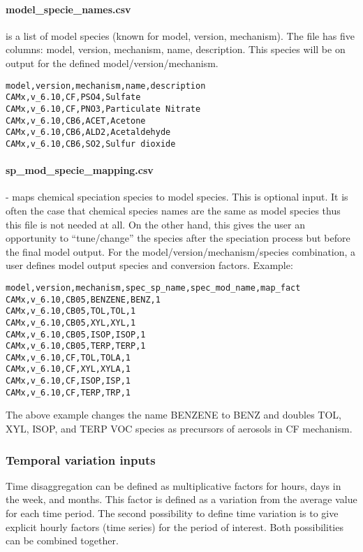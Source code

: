 \documentclass[a4paper,11pt]{article}
\begin{document}
\paragraph{model\_specie\_names.csv} is a 
list of model species (known for model, version, mechanism). The file
has five columns: model, version, mechanism, name, description. This
species will be on output for the defined model/version/mechanism.
\begin{verbatim}
model,version,mechanism,name,description
CAMx,v_6.10,CF,PSO4,Sulfate
CAMx,v_6.10,CF,PNO3,Particulate Nitrate
CAMx,v_6.10,CB6,ACET,Acetone
CAMx,v_6.10,CB6,ALD2,Acetaldehyde
CAMx,v_6.10,CB6,SO2,Sulfur dioxide
\end{verbatim}

\paragraph{sp\_mod\_specie\_mapping.csv} - maps chemical speciation species to model
  species. This is optional input. It is often the case that chemical species names are the same as model species thus this file is not needed at all. On the other hand, this gives the user an opportunity to ``tune/change'' the species after the speciation process but before the final model output. For the model/version/mechanism/species combination, a user defines model output species and conversion factors. Example:
\begin{verbatim} 
model,version,mechanism,spec_sp_name,spec_mod_name,map_fact
CAMx,v_6.10,CB05,BENZENE,BENZ,1
CAMx,v_6.10,CB05,TOL,TOL,1
CAMx,v_6.10,CB05,XYL,XYL,1
CAMx,v_6.10,CB05,ISOP,ISOP,1
CAMx,v_6.10,CB05,TERP,TERP,1
CAMx,v_6.10,CF,TOL,TOLA,1
CAMx,v_6.10,CF,XYL,XYLA,1
CAMx,v_6.10,CF,ISOP,ISP,1
CAMx,v_6.10,CF,TERP,TRP,1
\end{verbatim}
The above example changes the name BENZENE to BENZ and doubles TOL, XYL, ISOP, and TERP VOC species as precursors of aerosols in CF mechanism. 

\subsubsection{Temporal variation inputs}\label{temporal-variation-inputs}

Time disaggregation can be defined as multiplicative factors for hours, days in the week,
and months. This factor is defined as a variation from the average value for each
time period. The second possibility to define time variation is to give
explicit hourly factors (time series) for the period of interest. Both
possibilities can be combined together.
\end{document}
